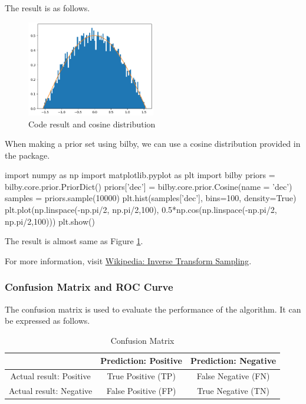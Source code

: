 \begin{example}
The result is as follows.

\begin{figure}[h]
\centering
\includegraphics[width=0.5\textwidth]{figs/cos.png}
\caption{Code result and cosine distribution}\label{cosinedistribution}
\end{figure}

When making a prior set using bilby, we can use a cosine distribution provided in the package.

\begin{python}[Python3]
import numpy as np
import matplotlib.pyplot as plt
import bilby
priors = bilby.core.prior.PriorDict()
priors['dec'] = bilby.core.prior.Cosine(name = 'dec')
samples = priors.sample(10000)
plt.hist(samples['dec'], bins=100, density=True)
plt.plot(np.linspace(-np.pi/2, np.pi/2,100), 
         0.5*np.cos(np.linspace(-np.pi/2, np.pi/2,100)))
plt.show()
\end{python}

The result is almost same as Figure \ref{cosinedistribution}.

\end{example}

For more information, visit \href{https://en.wikipedia.org/wiki/Inverse_transform_sampling}{Wikipedia: Inverse Transform Sampling}.

\subsubsection{Confusion Matrix and ROC Curve}

The confusion matrix is used to evaluate the performance of the algorithm. It can be expressed as follows.

\begin{table}[h]
    \centering
    \begin{tabular}{c|cc}
         & Prediction: Positive & Prediction: Negative \\ \hline
        Actual result: Positive & True Positive (TP) & False Negative (FN)\\
        Actual result: Negative & False Positive (FP) & True Negative (TN)
    \end{tabular}
    \caption{Confusion Matrix}
    \label{confusion}
\end{table}

